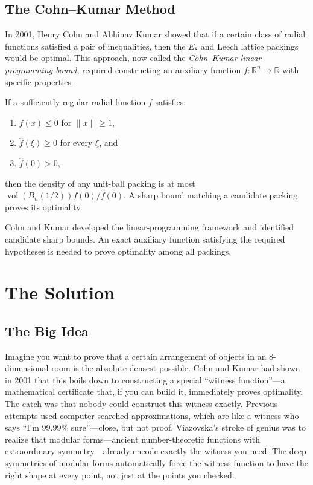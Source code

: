 \subsection{The Cohn--Kumar Method}

In 2001, Henry Cohn and Abhinav Kumar showed that if a certain class of radial functions satisfied a pair of inequalities, then the $E_8$ and Leech lattice packings would be optimal. This approach, now called the \emph{Cohn--Kumar linear programming bound}, required constructing an auxiliary function $f: \mathbb{R}^n \to \mathbb{R}$ with specific properties \cite{cohn2003}.

\begin{theorem}
If a sufficiently regular radial function $f$ satisfies:
\begin{enumerate}
\item $f(x)\leq0$ for $\|x\|\geq1$,
\item $\widehat f(\xi)\geq0$ for every $\xi$, and
\item $\widehat f(0)>0$,
\end{enumerate}
then the density of any unit-ball packing is at most $\operatorname{vol}(B_n(1/2))f(0)/\widehat f(0)$. A sharp bound matching a candidate packing proves its optimality.
\end{theorem}

Cohn and Kumar developed the linear-programming framework and identified candidate sharp bounds. An exact auxiliary function satisfying the required hypotheses is needed to prove optimality among all packings.

\section{The Solution}

\subsection{The Big Idea}
Imagine you want to prove that a certain arrangement of objects in an 8-dimensional room is the absolute densest possible. Cohn and Kumar had shown in 2001 that this boils down to constructing a special ``witness function''---a mathematical certificate that, if you can build it, immediately proves optimality. The catch was that nobody could construct this witness exactly. Previous attempts used computer-searched approximations, which are like a witness who says ``I'm 99.99\% sure''---close, but not proof. Viazovska's stroke of genius was to realize that modular forms---ancient number-theoretic functions with extraordinary symmetry---already encode exactly the witness you need. The deep symmetries of modular forms automatically force the witness function to have the right shape at every point, not just at the points you checked.


